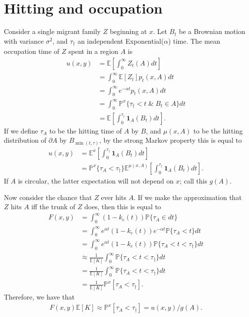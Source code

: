 \documentclass{article}
\renewcommand{\P}{\mathbb{P}}
\newcommand{\E}{\mathbb{E}}
\newcommand{\one}{\mathbf{1}}
\begin{document}
\section{Hitting and occupation}
\label{apx:hitting_occupation}

Consider a single migrant family $Z$ beginning at $x$.
Let $B_t$ be a Brownian motion with variance $\sigma^2$, 
and $\tau_\dagger$ an independent Exponential($\alpha$) time.
The mean occupation time of $Z$ spent in a region $A$ is 
\begin{align}
    u(x,y) &= \E[\int_0^\infty Z_t(A) dt ] \\
           &= \int_0^\infty \E[Z_t] p_t(x,A) dt \\
        &= \int_0^\infty e^{-\alpha t} p_t(x,A) dt \\
        &= \int_0^\infty \P^x\{ \tau_\dagger < t \; \& \; B_t \in A \} dt \\
        &= \E[ \int_0^{\tau_\dagger} \one_A(B_t) dt ]  .
\end{align}
If we define
$\tau_A$ to be the hitting time of $A$ by $B$,
and $\mu(x,A)$ to be the hitting distribution of $\partial A$ by $B_{\min(t,\tau)}$,
by the strong Markov property this is equal to
\begin{align}
    u(x,y) &= \E^x[ \int_0^{\tau_\dagger} \one_A(B_t) dt ] \\
           &= \P^x\{ \tau_A < \tau_\dagger \}  \E^{\mu(x,A)}[ \int_0^{\tau_\dagger} \one_A(B_t) dt ] .
\end{align}
If $A$ is circular, the latter expectation will not depend on $x$;
call this $g(A)$.

Now consider the chance that $Z$ ever hits $A$.
If we make the approximation that $Z$ hits $A$ iff the trunk of $Z$ does,
then this is equal to
\begin{align}
    F(x,y) &= \int_0^\infty (1-k_e(t)) \P\{ \tau_A \in dt \} \\
           &= \int_0^\infty e^{\alpha t} (1-k_e(t)) e^{- \alpha t } \P\{ \tau_A < t \} dt \\
    &=\int_0^\infty e^{\alpha t} (1-k_e(t)) \P\{ \tau_A < t < \tau_\dagger \} dt \\
    &\approx \frac{1}{\E[K]} \int_0^\infty \P\{ \tau_A < t < \tau_\dagger \} dt \\
    &= \frac{1}{\E[K]} \int_0^\infty \P\{ \tau_A < t < \tau_\dagger \} dt \\
    &= \frac{1}{\E[K]} \P^x[ \tau_A < \tau_\dagger ] .
\end{align}
Therefore, we have that
\begin{align}
    F(x,y) \E[K] 
    \approx \P^x[ \tau_A < \tau_\dagger ] 
    = u(x,y) / g(A) .
\end{align}
\end{document}
